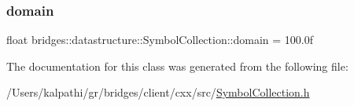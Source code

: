 \subsubsection{\texorpdfstring{domain}{domain}}
{\footnotesize\ttfamily float bridges\+::datastructure\+::\+Symbol\+Collection\+::domain = 100.\+0f\hspace{0.3cm}{\ttfamily [protected]}}



The documentation for this class was generated from the following file\+:\begin{DoxyCompactItemize}
\item 
/\+Users/kalpathi/gr/bridges/client/cxx/src/\mbox{\hyperlink{_symbol_collection_8h}{Symbol\+Collection.\+h}}\end{DoxyCompactItemize}
